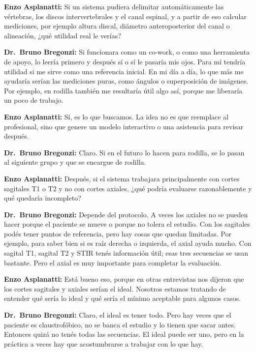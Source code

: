 \noindent\textbf{Enzo Asplanatti:} Si un sistema pudiera delimitar automáticamente las vértebras, los discos intervertebrales y el canal espinal, y a partir de eso calcular mediciones, por ejemplo altura discal, diámetro anteroposterior del canal o alineación, ¿qué utilidad real le verías?

\noindent\textbf{Dr.~Bruno Bregonzi:} Si funcionara como un co-work, o como una herramienta de apoyo, lo leería primero y después sí o sí le pasaría mis ojos. Para mí tendría utilidad si me sirve como una referencia inicial. En mi día a día, lo que más me ayudaría serían las mediciones puras, como ángulos o superposición de imágenes. Por ejemplo, en rodilla también me resultaría útil algo así, porque me liberaría un poco de trabajo.

\noindent\textbf{Enzo Asplanatti:} Sí, es lo que buscamos. La idea no es que reemplace al profesional, sino que genere un modelo interactivo o una asistencia para revisar después.

\noindent\textbf{Dr.~Bruno Bregonzi:} Claro. Si en el futuro lo hacen para rodilla, se lo pasan al siguiente grupo y que se encargue de rodilla.

\noindent\textbf{Enzo Asplanatti:} Después, si el sistema trabajara principalmente con cortes sagitales T1 o T2 y no con cortes axiales, ¿qué podría evaluarse razonablemente y qué quedaría incompleto?

\noindent\textbf{Dr.~Bruno Bregonzi:} Depende del protocolo. A veces los axiales no se pueden hacer porque el paciente se mueve o porque no tolera el estudio. Con los sagitales podés tener puntos de referencia, pero hay cosas que quedan limitadas. Por ejemplo, para saber bien si es raíz derecha o izquierda, el axial ayuda mucho. Con sagital T1, sagital T2 y STIR tenés información útil; esas tres secuencias se usan bastante. Pero el axial es muy importante para completar la evaluación.

\noindent\textbf{Enzo Asplanatti:} Está bueno eso, porque en otras entrevistas nos dijeron que los cortes sagitales y axiales serían el ideal. Nosotros estamos tratando de entender qué sería lo ideal y qué sería el mínimo aceptable para algunos casos.

\noindent\textbf{Dr.~Bruno Bregonzi:} Claro, el ideal es tener todo. Pero hay veces que el paciente es claustrofóbico, no se banca el estudio y lo tienen que sacar antes. Entonces quizá no tenés todas las secuencias. El ideal puede ser uno, pero en la práctica a veces hay que acostumbrarse a trabajar con lo que hay.

